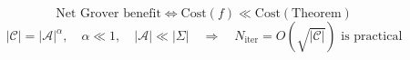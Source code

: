 \begin{equation}
\text{Net Grover benefit} \iff \mathrm{Cost}(f) \ll \mathrm{Cost}(\text{Theorem})
\end{equation}
\begin{equation}
|\mathcal{C}| = |\mathcal{A}|^{\alpha},\quad \alpha \ll 1,\quad |\mathcal{A}| \ll |\Sigma|
\quad\Rightarrow\quad N_{\mathrm{iter}} = O\!\left(\sqrt{|\mathcal{C}|}\right) \text{ is practical}
\end{equation}
